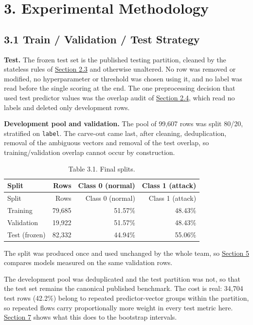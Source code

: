 \documentclass[
  canadian,
  12pt,
]{article}
\let\reportOrigSection\section
\renewcommand{\section}{\par\Needspace*{10\baselineskip}\reportOrigSection}%
\let\reportOrigSubsection\subsection
\renewcommand{\subsection}{\par\Needspace*{8\baselineskip}\reportOrigSubsection}%
\begin{document}
\section[\texorpdfstring{\numberline{3.}Experimental Methodology}{3. Experimental Methodology}]{3. Experimental Methodology}\label{sec-3}

\subsection[\texorpdfstring{\numberline{3.1}Train / Validation / Test Strategy}{3.1 Train / Validation / Test Strategy}]{3.1 Train / Validation / Test Strategy}\label{sec-3-1}

\textbf{Test.} The frozen test set is the published testing partition,
cleaned by the stateless rules of \hyperref[sec-2-3]{Section 2.3} and
otherwise unaltered. No row was removed or modified, no hyperparameter
or threshold was chosen using it, and no label was read before the
single scoring at the end. The one preprocessing decision that used test
predictor values was the overlap audit of \hyperref[sec-2-4]{Section
2.4}, which read no labels and deleted only development rows.

\textbf{Development pool and validation.} The pool of 99,607 rows was
split 80/20, stratified on \texttt{label}. The carve-out came last,
after cleaning, deduplication, removal of the ambiguous vectors and
removal of the test overlap, so training/validation overlap cannot occur
by construction.

\begin{longtable}[]{@{}lrrr@{}}
\caption{Table 3.1. Final splits.}\tabularnewline
\toprule\noalign{}
Split & Rows & Class 0 (normal) & Class 1 (attack) \\
\midrule\noalign{}
\endfirsthead
\toprule\noalign{}
Split & Rows & Class 0 (normal) & Class 1 (attack) \\
\midrule\noalign{}
\endhead
\bottomrule\noalign{}
\endlastfoot
Training & 79,685 & 51.57\% & 48.43\% \\
Validation & 19,922 & 51.57\% & 48.43\% \\
Test (frozen) & 82,332 & 44.94\% & 55.06\% \\
\end{longtable}

The split was produced once and used unchanged by the whole team, so
\hyperref[sec-5]{Section 5} compares models measured on the same
validation rows.

The development pool was deduplicated and the test partition was not, so
that the test set remains the canonical published benchmark. The cost is
real: 34,704 test rows (42.2\%) belong to repeated predictor-vector
groups within the partition, so repeated flows carry proportionally more
weight in every test metric here. \hyperref[sec-7]{Section 7} shows what
this does to the bootstrap intervals.
\end{document}
